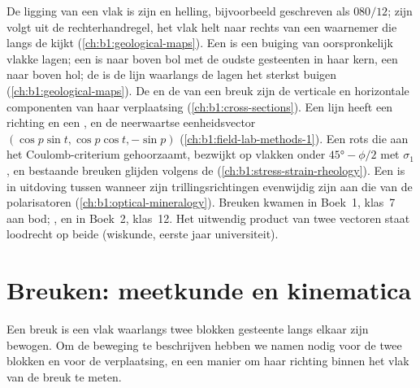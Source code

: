 \begin{recall}
De ligging van een vlak is zijn  en helling, bijvoorbeeld geschreven als $080/12$; zijn  volgt uit de rechterhandregel, het vlak helt naar rechts van een waarnemer die langs de  kijkt (\cref{ch:b1:geological-maps}). Een  is een buiging van oorspronkelijk vlakke lagen; een  is naar boven bol met de oudste gesteenten in haar kern, een  naar boven hol; de  is de lijn waarlangs de lagen het sterkst buigen (\cref{ch:b1:geological-maps}). De  en de  van een breuk zijn de verticale en horizontale componenten van haar verplaatsing (\cref{ch:b1:cross-sections}). Een lijn heeft een richting en een , en de neerwaartse eenheidsvector $(\cos p\sin t, \cos p\cos t, -\sin p)$ (\cref{ch:b1:field-lab-methods-1}). Een rots die aan het Coulomb-criterium gehoorzaamt, bezwijkt op vlakken onder $\ang{45} - \phi/2$ met $\sigma_1$, en bestaande breuken glijden volgens de  (\cref{ch:b1:stress-strain-rheology}). Een  is in uitdoving tussen  wanneer zijn trillingsrichtingen evenwijdig zijn aan die van de polarisatoren (\cref{ch:b1:optical-mineralogy}). Breuken kwamen in Boek~1, klas~7 aan bod; ,  en  in Boek~2, klas~12. Het uitwendig product van twee vectoren staat loodrecht op beide (wiskunde, eerste jaar universiteit).
\end{recall}

\section{Breuken: meetkunde en kinematica}\label{sec:b1:faults-folds-fabrics:faults}

Een breuk is een vlak waarlangs twee blokken gesteente langs elkaar zijn bewogen. Om de beweging te beschrijven hebben we namen nodig voor de twee blokken en voor de verplaatsing, en een manier om haar richting binnen het vlak van de breuk te meten.

